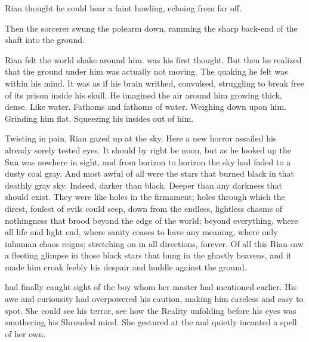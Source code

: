 \begin{garbage}
Rian thought he could hear a faint howling, echoing from far off. 

Then the sorcerer swung the polearm down, ramming the sharp back-end of the shaft into the ground. 

Rian felt the world shake around him.  was his first thought. But then he realized that the ground under him was actually not moving. The quaking he felt was within his mind. It was as if his brain writhed, convulsed, struggling to break free of its prison inside his skull. He imagined the air around him growing thick, dense. Like water. Fathoms and fathoms of water. Weighing down upon him. Grinding him flat. Squeezing his insides out of him. 

Twisting in pain, Rian gazed up at the sky. Here a new horror assailed his already sorely tested eyes. 
It should by right be noon, 
but as he looked up the Sun was nowhere in sight, and from horizon to horizon the sky had faded to a dusty coal gray. 
And most awful of all were the stars that burned black in that deathly gray sky. Indeed, darker than black. Deeper than any darkness that should exist. They were like holes in the firmament; holes through which the direst, foulest of evils could seep, down from the endless, lightless chasms of nothingness that brood beyond the edge of the world; beyond everything, where all life and light end, where sanity ceases to have any meaning, where only inhuman chaos reigns; stretching on in all directions, forever. Of all this Rian saw a fleeting glimpse in those black stars that hung in the ghastly heavens, and it made him croak feebly his despair and huddle against the ground. 









\begin{comment}
\subsection{The \ghobal}
\end{comment}

\begin{comment}
\subsubsection{\Criseis}
\end{comment}
\new
\Criseis{} had finally caught sight of the boy whom her master had mentioned earlier. 
His awe and curiousity had overpowered his caution, making him careless and easy to spot. 
She could see his terror, see how the Reality unfolding before his eyes was smothering his Shrouded mind. 
She gestured at the \human{} and quietly incanted a spell of her own. 








\end{garbage}
